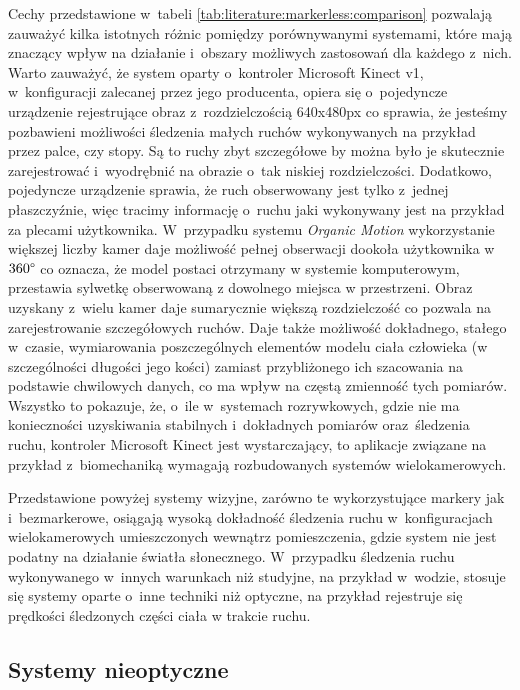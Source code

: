 Cechy przedstawione w~tabeli \ref{tab:literature:markerless:comparison} pozwalają zauważyć kilka istotnych różnic pomiędzy porównywanymi systemami, które mają znaczący wpływ na działanie i~obszary możliwych zastosowań dla każdego z~nich. Warto zauważyć, że system oparty o~kontroler Microsoft Kinect v1, w~konfiguracji zalecanej przez jego producenta, opiera się o~pojedyncze urządzenie rejestrujące obraz z~rozdzielczością 640x480px co sprawia, że jesteśmy pozbawieni możliwości śledzenia małych ruchów wykonywanych na przykład przez palce, czy stopy. Są to ruchy zbyt szczegółowe by można było je skutecznie zarejestrować i~wyodrębnić na obrazie o~tak niskiej rozdzielczości. Dodatkowo, pojedyncze urządzenie sprawia, że ruch obserwowany jest tylko z~jednej płaszczyźnie, więc tracimy informację o~ruchu jaki wykonywany jest na przykład za plecami użytkownika. W~przypadku systemu \emph{Organic Motion} wykorzystanie większej liczby kamer daje możliwość pełnej obserwacji dookoła użytkownika w~$360\degree$ co oznacza, że model postaci otrzymany w systemie komputerowym, przestawia sylwetkę obserwowaną z dowolnego miejsca w przestrzeni. Obraz uzyskany z~wielu kamer daje sumarycznie większą rozdzielczość co pozwala na zarejestrowanie szczegółowych ruchów. Daje także możliwość dokładnego, stałego w~czasie, wymiarowania poszczególnych elementów modelu ciała człowieka (w szczególności długości jego kości) zamiast przybliżonego ich szacowania na podstawie chwilowych danych, co ma wpływ na częstą zmienność tych pomiarów. Wszystko to pokazuje, że, o~ile w~systemach rozrywkowych, gdzie nie ma konieczności uzyskiwania stabilnych i~dokładnych pomiarów oraz~śledzenia ruchu, kontroler Microsoft Kinect jest wystarczający, to aplikacje związane na przykład z~biomechaniką wymagają rozbudowanych systemów wielokamerowych.
			
Przedstawione powyżej systemy wizyjne, zarówno te wykorzystujące markery jak i~bezmarkerowe, osiągają wysoką dokładność śledzenia ruchu w~konfiguracjach wielokamerowych umieszczonych wewnątrz pomieszczenia, gdzie system nie jest podatny na działanie światła słonecznego. W~przypadku śledzenia ruchu wykonywanego w~innych warunkach niż studyjne, na przykład w~wodzie, stosuje się systemy oparte o~inne techniki niż optyczne, na przykład rejestruje się prędkości śledzonych części ciała w trakcie ruchu.
			
\subsection{Systemy nieoptyczne}
			
